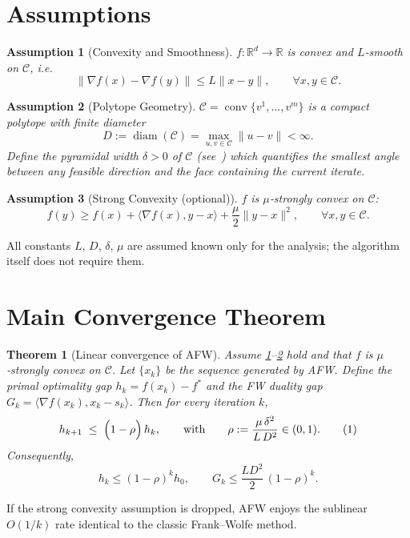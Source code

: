 \documentclass{article}
\newtheorem{theorem}{Theorem}[section]
\newtheorem{assumption}{Assumption}[section]
\newcommand{\R}{\mathbb{R}}
\newcommand{\cC}{\mathcal{C}}
\newcommand{\diam}{\operatorname{diam}}
\newcommand{\conv}{\operatorname{conv}}
\newcommand{\inner}[2]{\langle #1,#2\rangle}
\begin{document}
\section*{Assumptions}
\begin{assumption}[Convexity and Smoothness]\label{ass:convex-smooth}
$f:\R^{d}\rightarrow\R$ is convex and $L$‑smooth on $\cC$, i.e.
\[
\|\nabla f(x)-\nabla f(y)\|\le L\|x-y\|,\qquad\forall x,y\in\cC.
\]
\end{assumption}
\begin{assumption}[Polytope Geometry]\label{ass:polytope}
$\cC=\conv\{v^{1},\dots ,v^{m}\}$ is a compact polytope with finite diameter
\[
D:=\diam(\cC)=\max_{u,v\in\cC}\|u-v\|<\infty .
\]
Define the \emph{pyramidal width} $\delta>0$ of $\cC$ (see~\cite{lacoste2015linear}) which quantifies the smallest angle between any feasible direction and the face containing the current iterate.
\end{assumption}
\begin{assumption}[Strong Convexity (optional)]\label{ass:strong}
$f$ is $\mu$‑strongly convex on $\cC$:
\[
f(y)\ge f(x)+\inner{\nabla f(x)}{y-x}+ \frac{\mu}{2}\|y-x\|^{2},\qquad\forall x,y\in\cC .
\]
\end{assumption}
All constants $L$, $D$, $\delta$, $\mu$ are assumed known only for the analysis; the algorithm itself does not require them.

\section*{Main Convergence Theorem}
\begin{theorem}[Linear convergence of AFW]\label{thm:linear}
Assume \ref{ass:convex-smooth}–\ref{ass:polytope} hold and that $f$ is $\mu$‑strongly convex on $\cC$.
Let $\{x_{k}\}$ be the sequence generated by AFW.
Define the primal optimality gap $h_{k}=f(x_{k})-f^{*}$ and the FW duality gap $G_{k}= \inner{\nabla f(x_{k})}{x_{k}-s_{k}}$.
Then for every iteration $k$,
\[
h_{k+1}\;\le\;\Bigl(1-\rho\Bigr)\,h_{k},
\qquad\text{with}\qquad 
\rho:=\frac{\mu\,\delta^{2}}{L\,D^{2}}\in(0,1).
\tag{1}
\]
Consequently,
\[
h_{k}\le (1-\rho)^{k}h_{0},\qquad 
G_{k}\le \frac{L D^{2}}{2}\,(1-\rho)^{k}.
\]
\end{theorem}
If the strong convexity assumption is dropped, AFW enjoys the sublinear $O(1/k)$ rate identical to the classic Frank–Wolfe method.
\end{document}
